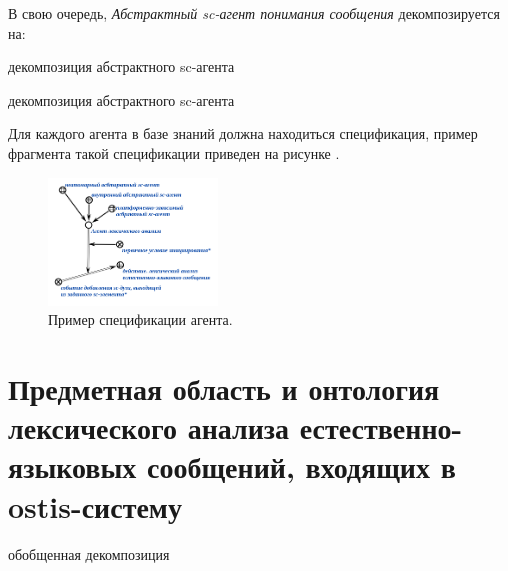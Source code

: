 В свою очередь, \textit{Абстрактный sc-агент понимания сообщения} декомпозируется на:

\begin{SCn}

    \begin{scnrelfromset}{декомпозиция абстрактного sc-агента}
        \begin{scnindent}
            \begin{scnrelfromset}{декомпозиция абстрактного sc-агента}
            \end{scnrelfromset}
        \end{scnindent}
    \end{scnrelfromset}

\end{SCn}

Для каждого агента в базе знаний должна находиться спецификация, пример фрагмента такой спецификации приведен на рисунке \textit{}.

\begin{figure}[h]
    \centering
    \includegraphics[width=0.4\textwidth]{images/part4/chapter_nl_interfaces/agent_spec.png}
    \caption{Пример спецификации агента.}
    \label{fig:agent_spec}
\end{figure}

\section{Предметная область и онтология лексического анализа естественно-языковых сообщений, входящих в ostis-систему}

\begin{SCn}

    \begin{scnrelfromset}{обобщенная декомпозиция}
    \end{scnrelfromset}

\end{SCn}

